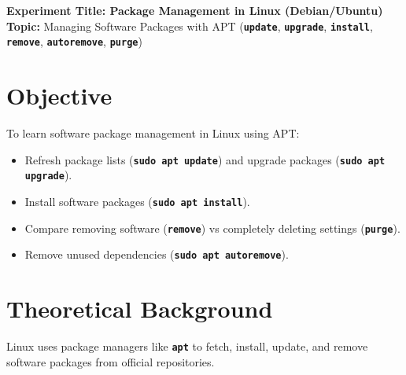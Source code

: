 \documentclass[10pt,a4paper]{article}
\newcommand{\cmd}[1]{\texttt{\textbf{#1}}}
\begin{document}
\raggedbottom
\thispagestyle{firstpage}

\begin{center}
  {\Large\bfseries\sffamily\color{primary} Experiment Title: Package Management in Linux (Debian/Ubuntu)}\\[3pt]
  {\normalsize\sffamily\textbf{Topic:} Managing Software Packages with APT (\cmd{update}, \cmd{upgrade}, \cmd{install}, \cmd{remove}, \cmd{autoremove}, \cmd{purge})}
\end{center}
\vspace{-4pt}

\section{Objective}
To learn software package management in Linux using APT:
\begin{itemize}[noitemsep,topsep=1pt,leftmargin=1.2em]
  \item Refresh package lists (\cmd{sudo apt update}) and upgrade packages (\cmd{sudo apt upgrade}).
  \item Install software packages (\cmd{sudo apt install}).
  \item Compare removing software (\cmd{remove}) vs completely deleting settings (\cmd{purge}).
  \item Remove unused dependencies (\cmd{sudo apt autoremove}).
\end{itemize}

\section{Theoretical Background}
Linux uses package managers like \cmd{apt} to fetch, install, update, and remove software packages from official repositories.
\end{document}
